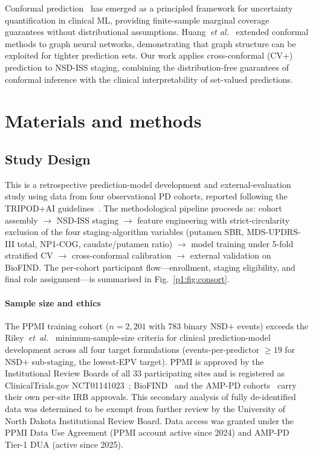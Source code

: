 \documentclass[10pt,letterpaper]{article}
\begin{document}
Conformal prediction~\cite{vovk2022} has emerged as a principled framework for uncertainty quantification in clinical ML, providing finite-sample marginal coverage guarantees without distributional assumptions. Huang~\textit{et al.}~\cite{huang2023} extended conformal methods to graph neural networks, demonstrating that graph structure can be exploited for tighter prediction sets. Our work applies cross-conformal (CV+) prediction to NSD-ISS staging, combining the distribution-free guarantees of conformal inference with the clinical interpretability of set-valued predictions.

\section*{Materials and methods}
\label{p1:sec:methods}

\subsection*{Study Design}
This is a retrospective prediction-model development and external-evaluation study using data from four observational PD cohorts, reported following the TRIPOD+AI guidelines~\cite{collins2024}. The methodological pipeline proceeds as: cohort assembly $\to$ NSD-ISS staging $\to$ feature engineering with strict-circularity exclusion of the four staging-algorithm variables (putamen SBR, MDS-UPDRS-III total, NP1-COG, caudate/putamen ratio) $\to$ model training under 5-fold stratified CV $\to$ cross-conformal calibration $\to$ external validation on BioFIND. The per-cohort participant flow---enrollment, staging eligibility, and final role assignment---is summarised in Fig.~\ref{p1:fig:consort}.

\paragraph*{Sample size and ethics} The PPMI training cohort ($n{=}2{,}201$ with 783 binary NSD$+$ events) exceeds the Riley~\textit{et~al.}~\cite{riley2020sampsize} minimum-sample-size criteria for clinical prediction-model development across all four target formulations (events-per-predictor $\geq 19$ for NSD$+$ sub-staging, the lowest-EPV target). PPMI is approved by the Institutional Review Boards of all 33 participating sites and is registered as ClinicalTrials.gov NCT01141023~\cite{marek2018ppmi}; BioFIND~\cite{russo2025} and the AMP-PD cohorts~\cite{biofind2025nsd} carry their own per-site IRB approvals. This secondary analysis of fully de-identified data was determined to be exempt from further review by the University of North Dakota Institutional Review Board. Data access was granted under the PPMI Data Use Agreement (PPMI account active since 2024) and AMP-PD Tier-1 DUA (active since 2025).
\end{document}
